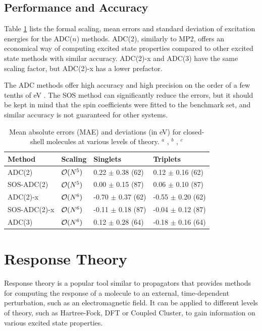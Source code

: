 
\FloatBarrier

\subsection{Performance and Accuracy}

Table \ref{tab:ADCSTATS} lists the formal scaling, mean errors and standard deviation of excitation energies for the ADC($n$) methods. ADC(2), similarly to MP2, offers an economical way of computing excited state properties compared to other excited state methods with similar accuracy. ADC(2)-x and ADC(3) have the same scaling factor, but ADC(2)-x has a lower prefactor.  

The ADC methods offer high accuracy and high precision on the order of a few tenths of eV . The SOS method can significantly reduce the errors, but it should be kept in mind that the spin coefficients were fitted to the benchmark set, and similar accuracy is not guaranteed for other systems.

\begin{table}[h]
\centering
\begin{tabular}{llll}
\hline
Method & Scaling & Singlets & Triplets \\ \hline
ADC(2) & $\mathcal{O}(N^{5})$ & 0.22 $\pm$ 0.38 (62) & 0.12 $\pm$ 0.16 (62) \\
SOS-ADC(2) & $\mathcal{O}(N^{5})$ & 0.00 $\pm$ 0.15 (87) & 0.06 $\pm$ 0.10 (87) \\
ADC(2)-x & $\mathcal{O}(N^{6})$ & -0.70 $\pm$ 0.37 (62) & -0.55 $\pm$ 0.20 (62) \\
SOS-ADC(2)-x & $\mathcal{O}(N^{6})$ & -0.11 $\pm$ 0.18 (87) & -0.04 $\pm$ 0.12 (87) \\
ADC(3) & $\mathcal{O}(N^{6})$ & 0.12 $\pm$ 0.28 (64) & -0.18 $\pm$ 0.16 (64) \\ \hline  
\end{tabular}
\caption{Mean absolute errors (MAE) and deviations (in eV) for closed-shell molecules at various levels of theory. $^a$ \cite{Har2014}, $^b$ \cite{Kra2013}, $^c$ \cite{Tro2006}}
\label{tab:ADCSTATS}
\end{table}

\section{Response Theory}

Response theory is a popular tool similar to propagators that provides methods for computing the response of a molecule to an external, time-dependent perturbation, such as an electromagnetic field. It can be applied to different levels of theory, such as Hartree-Fock, DFT or Coupled Cluster, to gain information on various excited state properties.

